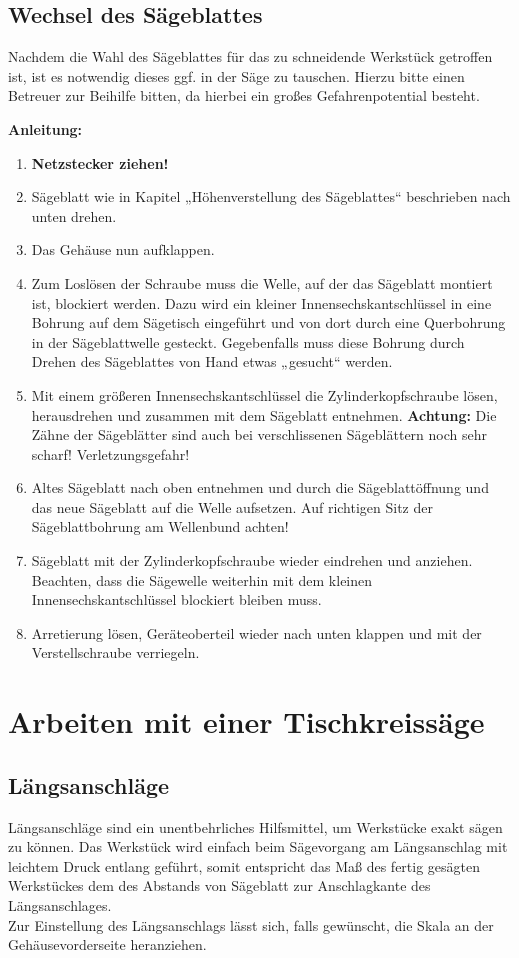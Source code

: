 \documentclass{\basedir/fablab-document}
\begin{document}
\subsection{Wechsel des Sägeblattes}

Nachdem die Wahl des Sägeblattes für das zu schneidende Werkstück getroffen ist, ist es notwendig dieses ggf. in der Säge zu tauschen. Hierzu bitte einen Betreuer zur Beihilfe bitten, da hierbei ein großes Gefahrenpotential besteht. 


\textbf{Anleitung:} \\
\renewcommand{\labelenumi}{\alph{enumi})}
\begin{enumerate}
	\item \textbf{Netzstecker ziehen!}
	\item Sägeblatt wie in Kapitel „Höhenverstellung des Sägeblattes“ beschrieben nach unten drehen.
	\item Das Gehäuse nun aufklappen.
	\item Zum Loslösen der Schraube  muss die Welle, auf der das Sägeblatt montiert ist, blockiert werden. Dazu wird ein kleiner Innensechskantschlüssel in eine Bohrung auf dem Sägetisch eingeführt und von dort durch eine Querbohrung in der Sägeblattwelle gesteckt. Gegebenfalls muss diese Bohrung durch Drehen des Sägeblattes von Hand etwas „gesucht“ werden.
	\item Mit einem größeren Innensechskantschlüssel die Zylinderkopfschraube lösen, herausdrehen und zusammen mit dem Sägeblatt entnehmen.
	\textbf{Achtung:}
	Die Zähne der Sägeblätter sind auch bei verschlissenen Sägeblättern noch sehr scharf! Verletzungsgefahr!
	\item Altes Sägeblatt nach oben entnehmen und durch die Sägeblattöffnung und das neue Sägeblatt auf die Welle aufsetzen. Auf richtigen Sitz der Sägeblattbohrung am Wellenbund achten!
	\item Sägeblatt mit der Zylinderkopfschraube wieder eindrehen und anziehen. Beachten, dass die Sägewelle weiterhin mit dem kleinen Innensechskantschlüssel blockiert bleiben muss.
	\item Arretierung lösen, Geräteoberteil wieder nach unten klappen und mit der Verstellschraube verriegeln.
\end{enumerate}

\section{Arbeiten mit einer Tischkreissäge}

\subsection{Längsanschläge}
Längsanschläge sind ein unentbehrliches Hilfsmittel, um Werkstücke exakt sägen zu können. Das Werkstück wird einfach beim Sägevorgang am Längsanschlag mit leichtem Druck entlang geführt, somit entspricht das Maß des fertig gesägten Werkstückes dem des Abstands von Sägeblatt zur Anschlagkante des Längsanschlages. \\
Zur Einstellung des Längsanschlags lässt sich, falls gewünscht, die Skala an der Gehäusevorderseite heranziehen.
\end{document}
